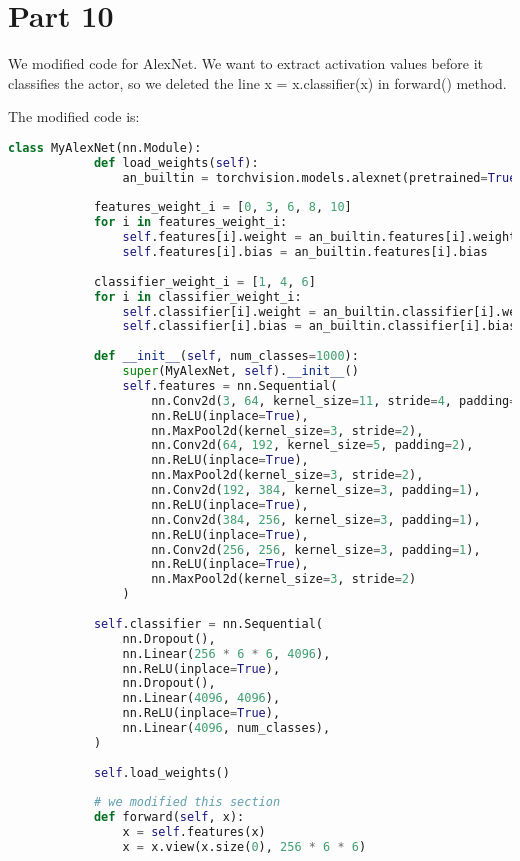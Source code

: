 \documentclass{article}
\newcommand{\enterProblemHeader}[1]{
}
\newcommand{\exitProblemHeader}[1]{
}
\newcounter{homeworkProblemCounter} %
\newcommand{\homeworkProblemName}{}
\newenvironment{homeworkProblem}[1][Problem \arabic{homeworkProblemCounter}]{ %
	\stepcounter{homeworkProblemCounter} %
	\renewcommand{\homeworkProblemName}{#1} %
	\section{\homeworkProblemName} %
	\enterProblemHeader{\homeworkProblemName} %
}{
	\exitProblemHeader{\homeworkProblemName} %
}
\begin{document}
		\clearpage
		\begin{homeworkProblem}[Part 10]
			
		We modified code for AlexNet.  We want to extract activation values before it classifies the actor, so we deleted the line x = x.classifier(x) in forward() method. 
		
		The modified code is:
		
		\begin{lstlisting}[language=Python, caption=modified code for AlexNet]
		class MyAlexNet(nn.Module):
			def load_weights(self):
				an_builtin = torchvision.models.alexnet(pretrained=True)
			
			features_weight_i = [0, 3, 6, 8, 10]
			for i in features_weight_i:
				self.features[i].weight = an_builtin.features[i].weight
				self.features[i].bias = an_builtin.features[i].bias
			
			classifier_weight_i = [1, 4, 6]
			for i in classifier_weight_i:
				self.classifier[i].weight = an_builtin.classifier[i].weight
				self.classifier[i].bias = an_builtin.classifier[i].bias
			
			def __init__(self, num_classes=1000):
				super(MyAlexNet, self).__init__()
				self.features = nn.Sequential(
					nn.Conv2d(3, 64, kernel_size=11, stride=4, padding=2),
					nn.ReLU(inplace=True),
					nn.MaxPool2d(kernel_size=3, stride=2),
					nn.Conv2d(64, 192, kernel_size=5, padding=2),
					nn.ReLU(inplace=True),
					nn.MaxPool2d(kernel_size=3, stride=2),
					nn.Conv2d(192, 384, kernel_size=3, padding=1),
					nn.ReLU(inplace=True),
					nn.Conv2d(384, 256, kernel_size=3, padding=1),
					nn.ReLU(inplace=True),
					nn.Conv2d(256, 256, kernel_size=3, padding=1),
					nn.ReLU(inplace=True),
					nn.MaxPool2d(kernel_size=3, stride=2)
				)
			
			self.classifier = nn.Sequential(
				nn.Dropout(),
				nn.Linear(256 * 6 * 6, 4096),
				nn.ReLU(inplace=True),
				nn.Dropout(),
				nn.Linear(4096, 4096),
				nn.ReLU(inplace=True),
				nn.Linear(4096, num_classes),
			)
			
			self.load_weights()
			
			# we modified this section
			def forward(self, x):
				x = self.features(x)
				x = x.view(x.size(0), 256 * 6 * 6)
		

\end{lstlisting}
\end{homeworkProblem}
\end{document}
